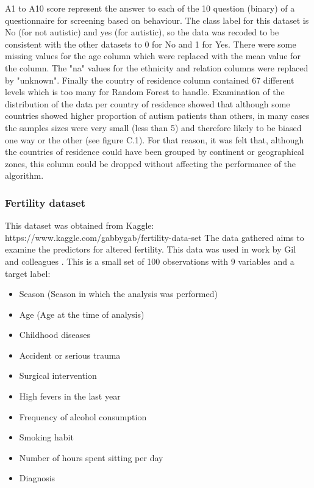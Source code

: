 A1 to A10 score represent the answer to each of the 10 question (binary) of a questionnaire for screening based on behaviour. 
The class label for this dataset is No (for not autistic) and yes (for autistic), so the data was recoded to be consistent with the other datasets to 0 for No and 1 for Yes.\newline
There were some missing values for the age column which were replaced with the mean value for the column. The "na" values for the ethnicity and relation columns were replaced by "unknown".\newline
Finally the country of residence column contained 67 different levels which is too many for Random Forest to handle.  Examination of the distribution of the data per country of residence showed that although some countries showed higher proportion of autism patients than others, in many cases the samples sizes were very small (less than 5) and therefore likely to be biased one way or the other (see figure C.1). For that reason, it was felt that, although the countries of residence could have been grouped by continent or geographical zones, this column could be dropped without affecting the performance of the algorithm. 

\subsubsection{Fertility dataset}
This dataset was obtained from Kaggle:\newline
https://www.kaggle.com/gabbygab/fertility-data-set \newline
The data gathered aims to examine the predictors for altered fertility. This data was used in work by Gil and colleagues \citep{Gil:quR8OHIJ}.\newline
This is a small set of 100 observations with 9 variables and a target label:
\begin{itemize}
    \item Season (Season in which the analysis was performed)
    \item Age (Age at the time of analysis)
    \item Childhood diseases
    \item Accident or serious trauma
    \item Surgical intervention
    \item High fevers in the last year
    \item Frequency of alcohol consumption
    \item Smoking habit
    \item Number of hours spent sitting per day
    \item Diagnosis
\end{itemize}


